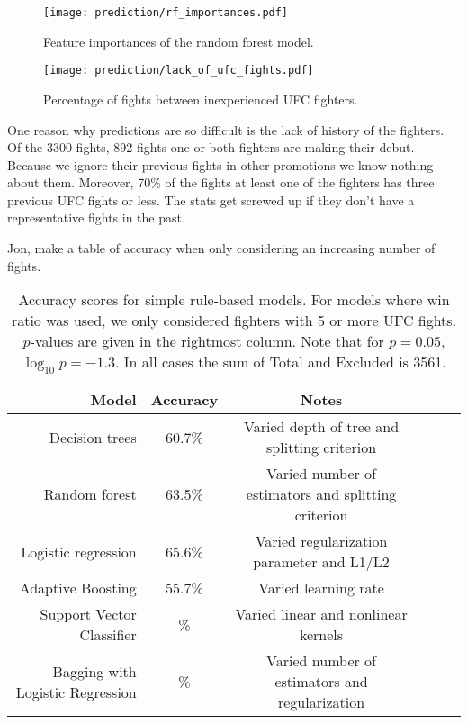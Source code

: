 \begin{figure}[h]
\begin{center}
\texttt{[image: prediction/rf\_importances.pdf]}
\caption{Feature importances of the random forest model.}
\label{rf_importances}
\end{center}
\end{figure}

\begin{figure}[h]
\begin{center}
\texttt{[image: prediction/lack\_of\_ufc\_fights.pdf]}
\caption{Percentage of fights between inexperienced UFC fighters.}
\label{lack_of_ufc_fights}
\end{center}
\end{figure}

One reason why predictions are so difficult is the lack of history
of the fighters. Of the 3300 fights, 892 fights one or both
fighters are making their debut. Because we ignore their previous
fights in other promotions we know nothing about them. Moreover,
70\% of the fights at least one of the fighters has three previous
UFC fights or less. The stats get screwed up if they don't have
a representative fights in the past.

Jon, make a table of accuracy when only considering an increasing
number of fights.

\begin{center}
\begin{table}[h]
\begin{tabular}{r|ccccc}
  \toprule
  Model & Accuracy & Notes\\
  \hline
  Decision trees & 60.7\% & Varied depth of tree and splitting criterion\\
  Random forest & 63.5\% & Varied number of estimators and splitting criterion\\
  Logistic regression & 65.6\% & Varied regularization parameter and L1/L2\\
  Adaptive Boosting & 55.7\% & Varied learning rate\\
  Support Vector Classifier & \% & Varied linear and nonlinear kernels\\
  Bagging with Logistic Regression & \% & Varied number of estimators and regularization\\
  \bottomrule
\end{tabular}
\caption{Accuracy scores for simple rule-based models. For models where win ratio was used, we only considered
fighters with 5 or more UFC fights. $p$-values are given in the rightmost column. Note that for $p=0.05$, $\log_{10}p = -1.3$. In all
cases the sum of
Total and Excluded is 3561.}
\label{table_ML_models}
\end{table}
\end{center}

